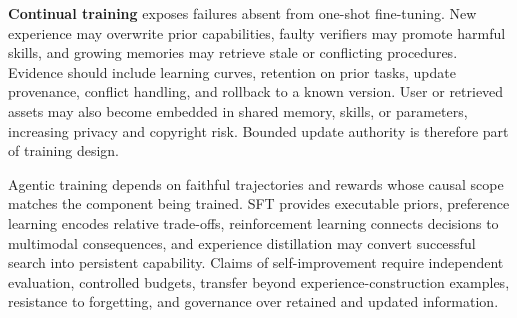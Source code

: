 \textbf{Continual training} exposes failures absent from one-shot fine-tuning. New experience may overwrite prior capabilities, faulty verifiers may promote harmful skills, and growing memories may retrieve stale or conflicting procedures. Evidence should include learning curves, retention on prior tasks, update provenance, conflict handling, and rollback to a known version. User or retrieved assets may also become embedded in shared memory, skills, or parameters, increasing privacy and copyright risk. Bounded update authority is therefore part of training design.

\begin{keytakeaway}
Agentic training depends on faithful trajectories and rewards whose causal scope matches the component being trained. SFT provides executable priors, preference learning encodes relative trade-offs, reinforcement learning connects decisions to multimodal consequences, and experience distillation may convert successful search into persistent capability. Claims of self-improvement require independent evaluation, controlled budgets, transfer beyond experience-construction examples, resistance to forgetting, and governance over retained and updated information.
\end{keytakeaway}
